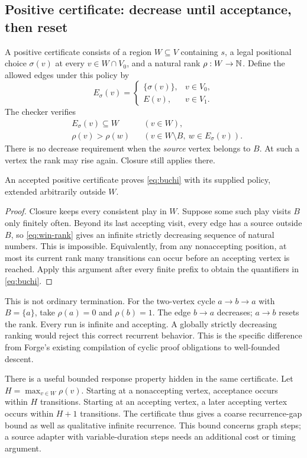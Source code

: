 \subsection{Positive certificate: decrease until acceptance, then reset}
A positive certificate consists of a region $W\subseteq V$ containing $s$, a
legal positional choice $\sigma(v)$ at every $v\in W\cap V_0$, and a natural
rank $\rho:W\to\mathbb{N}$. Define the allowed edges under this policy by
\[
 E_\sigma(v)=
 \begin{cases}
  \{\sigma(v)\},&v\in V_0,\\
  E(v),&v\in V_1.
 \end{cases}
\]
The checker verifies
\begin{align}
 &E_\sigma(v)\subseteq W &&(v\in W),\label{eq:win-closed}\\
 &\rho(v)>\rho(w) &&(v\in W\setminus B,\ w\in E_\sigma(v)).
 \label{eq:win-rank}
\end{align}
There is no decrease requirement when the \emph{source} vertex belongs to $B$.
At such a vertex the rank may rise again. Closure still applies there.

\begin{theorem}
\label{thm:buchi-rank}
An accepted positive certificate proves \eqref{eq:buchi} with its supplied
policy, extended arbitrarily outside $W$.
\end{theorem}
\begin{proof}
Closure keeps every consistent play in $W$. Suppose some such play visits $B$
only finitely often. Beyond its last accepting visit, every edge has a source
outside $B$, so \eqref{eq:win-rank} gives an infinite strictly decreasing
sequence of natural numbers. This is impossible. Equivalently, from any
nonaccepting position, at most its current rank many transitions can occur
before an accepting vertex is reached. Apply this argument after every finite
prefix to obtain the quantifiers in \eqref{eq:buchi}.
\end{proof}

This is not ordinary termination. For the two-vertex cycle $a\to b\to a$ with
$B=\{a\}$, take $\rho(a)=0$ and $\rho(b)=1$. The edge $b\to a$ decreases;
$a\to b$ resets the rank. Every run is infinite and accepting. A globally
strictly decreasing ranking would reject this correct recurrent behavior.
This is the specific difference from Forge's existing compilation of cyclic
proof obligations to well-founded descent.

There is a useful bounded response property hidden in the same certificate.
Let $H=\max_{v\in W}\rho(v)$. Starting at a nonaccepting vertex, acceptance
occurs within $H$ transitions. Starting at an accepting vertex, a later
accepting vertex occurs within $H+1$ transitions. The certificate thus gives a
coarse recurrence-gap bound as well as qualitative infinite recurrence.
This bound concerns graph steps; a source adapter with variable-duration steps
needs an additional cost or timing argument.

